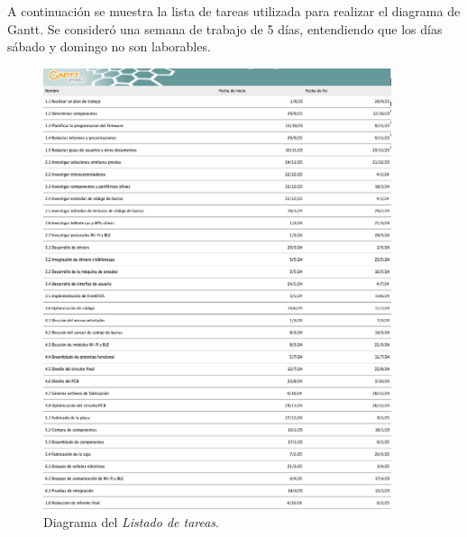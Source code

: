 \documentclass[
11pt, %
codirector, %
]{charter}
\begin{document}
A continuación se muestra la lista de tareas utilizada para realizar el diagrama de Gantt. Se consideró una semana de trabajo de 5 días, entendiendo que los días sábado y domingo no son laborables.
\begin{figure}[htpb]
\centering 
\includegraphics[width=0.91\textwidth]{./Figuras/Lista.png}
\caption{Diagrama del \textit{Listado de tareas}.}
\label{fig:AoN}
\end{figure}
\end{document}
